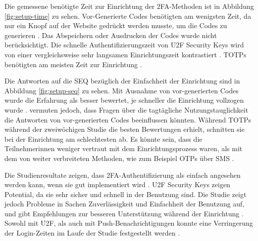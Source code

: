 Die gemessene benötigte Zeit zur Einrichtung der \ac{2FA}-Methoden ist in Abbildung \ref{fig:setup-time} zu sehen. Vor-Generierte Codes benötigten am wenigsten Zeit, da nur ein Knopf auf der Website gedrückt werden musste, um die Codes zu generieren \parencite{reeseUsabilityStudy2019}. Das Abspeichern oder Ausdrucken der Codes wurde nicht berücksichtigt. Die schnelle Authentifizierungszeit von \ac{U2F} Security Keys wird von einer vergleichsweise sehr langsamen Einrichtungszeit kontrastiert \parencite{reeseUsabilityStudy2019}. \acp{TOTP} benötigten am meisten Zeit zur Einrichtung \parencite{reeseUsabilityStudy2019}.

Die Antworten auf die \ac{SEQ} bezüglich der Einfachheit der Einrichtung sind in Abbildung \ref{fig:setup-seq} zu sehen. Mit Ausnahme von vor-generierten Codes wurde die Erfahrung als besser bewertet, je schneller die Einrichtung vollzogen wurde \parencite{reeseUsabilityStudy2019}. \textcite{reeseUsabilityStudy2019} vermuten jedoch, dass Fragen über die tagtägliche Nutzungstauglichkeit die Antworten von vor-generierten Codes beeinflussen könnten. Während \acp{TOTP} während der zweiwöchigen Studie die besten Bewertungen erhielt, schnitten sie bei der Einrichtung am schlechtesten ab. Es könnte sein, dass die Teilnehmerinnen weniger vertraut mit dem Einrichtungsprozess waren, als mit dem von weiter verbreiteten Methoden, wie zum Beispiel \acp{OTP} über SMS \parencite{reeseUsabilityStudy2019}.

\pskip
Die Studienresultate zeigen, dass \ac{2FA}-Authentifizierung als einfach angesehen werden kann, wenn sie gut implementiert wird \parencite{reeseUsabilityStudy2019}. \ac{U2F} Security Keys zeigen Potential, da sie sehr sicher und schnell in der Benutzung sind. Die Studie zeigt jedoch Probleme in Sachen Zuverlässigkeit und Einfachheit der Benutzung auf, und gibt Empfehlungen zur besseren Unterstützung während der Einrichtung \parencite{reeseUsabilityStudy2019}. Sowohl mit \ac{U2F}, als auch mit Push-Benachrichtigungen konnte eine Verringerung der Login-Zeiten im Laufe der Studie festgestellt werden \parencite{reeseUsabilityStudy2019}.
